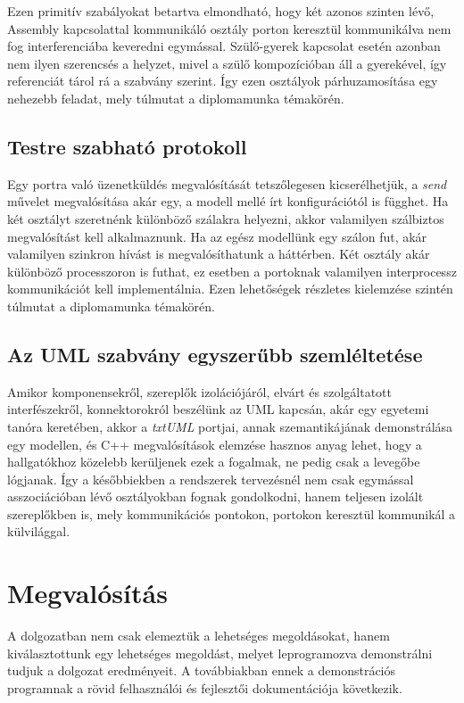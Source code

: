 \documentclass[a4paper,12pt]{report}
\begin{document}
Ezen primitív szabályokat betartva elmondható, hogy két azonos szinten lévő, Assembly kapcsolattal kommunikáló osztály porton keresztül kommunikálva nem fog interferenciába keveredni egymással. Szülő-gyerek kapcsolat esetén azonban nem ilyen szerencsés a helyzet, mivel a szülő kompozícióban áll a gyerekével, így referenciát tárol rá a szabvány szerint. Így ezen osztályok párhuzamosítása egy nehezebb feladat, mely túlmutat a diplomamunka témakörén.

\section{Testre szabható protokoll}
Egy portra való üzenetküldés megvalósítását tetszőlegesen kicserélhetjük, a \textit{send} művelet megvalósítása akár egy, a modell mellé írt konfigurációtól is függhet. Ha két osztályt szeretnénk különböző szálakra helyezni, akkor valamilyen szálbiztos megvalósítást kell alkalmaznunk. Ha az egész modellünk egy szálon fut, akár valamilyen szinkron hívást is megvalósíthatunk a háttérben. Két osztály akár különböző processzoron is futhat, ez esetben a portoknak valamilyen interprocessz kommunikációt kell implementálnia. Ezen lehetőségek részletes kielemzése szintén túlmutat a diplomamunka témakörén. 

\section{Az UML szabvány egyszerűbb szemléltetése}
Amikor komponensekről, szereplők izolációjáról, elvárt és szolgáltatott interfészekről, konnektorokról beszélünk az UML kapcsán, akár egy egyetemi tanóra keretében, akkor a \textit{txtUML} portjai, annak szemantikájának demonstrálása egy modellen, és C++ megvalósítások elemzése hasznos anyag lehet, hogy a hallgatókhoz közelebb kerüljenek ezek a fogalmak, ne pedig csak a levegőbe lógjanak. Így a későbbiekben a rendszerek tervezésnél nem csak egymással asszociációban lévő osztályokban fognak gondolkodni, hanem teljesen izolált szereplőkben is, mely kommunikációs pontokon, portokon keresztül kommunikál a külvilággal. 


\chapter{Megvalósítás}
A dolgozatban nem csak elemeztük a lehetséges megoldásokat, hanem kiválasztottunk egy lehetséges megoldást, melyet leprogramozva demonstrálni tudjuk a dolgozat eredményeit. A továbbiakban ennek a demonstrációs programnak a rövid felhasználói és fejlesztői dokumentációja következik.
\end{document}

